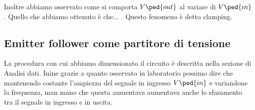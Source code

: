 Inoltre abbiamo osservato come si comporta $V\ped{out}$ al variare di $V\ped{in}$. Quello che abbiamo ottenuto è che... . Questo fenomeno è detto clamping.

\subsection*{Emitter follower come partitore di tensione}

La procedura con cui abbiamo dimensionato il circuito è descritta nella sezione di Analisi dati. Inine grazie a quanto osservato in laboratorio possimo dire che mantenendo costante l'ampiezza del segnale in ingresso $V\ped{in}$ e variandone la frequenza, man mano che questa aumentava aumentava anche lo sfasamento tra il segnale in ingresso e in uscita.
